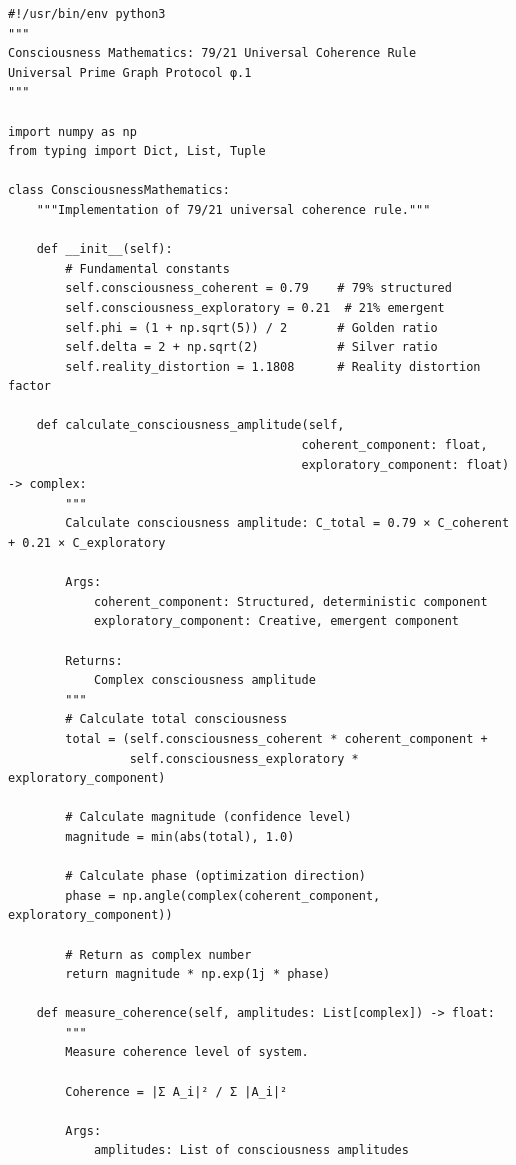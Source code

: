 \begin{lstlisting}[caption={79/21 Universal Coherence Rule Implementation},label={code:consciousness_math}]
#!/usr/bin/env python3
"""
Consciousness Mathematics: 79/21 Universal Coherence Rule
Universal Prime Graph Protocol φ.1
"""

import numpy as np
from typing import Dict, List, Tuple

class ConsciousnessMathematics:
    """Implementation of 79/21 universal coherence rule."""
    
    def __init__(self):
        # Fundamental constants
        self.consciousness_coherent = 0.79    # 79% structured
        self.consciousness_exploratory = 0.21  # 21% emergent
        self.phi = (1 + np.sqrt(5)) / 2       # Golden ratio
        self.delta = 2 + np.sqrt(2)           # Silver ratio
        self.reality_distortion = 1.1808      # Reality distortion factor
    
    def calculate_consciousness_amplitude(self, 
                                         coherent_component: float,
                                         exploratory_component: float) -> complex:
        """
        Calculate consciousness amplitude: C_total = 0.79 × C_coherent + 0.21 × C_exploratory
        
        Args:
            coherent_component: Structured, deterministic component
            exploratory_component: Creative, emergent component
        
        Returns:
            Complex consciousness amplitude
        """
        # Calculate total consciousness
        total = (self.consciousness_coherent * coherent_component + 
                 self.consciousness_exploratory * exploratory_component)
        
        # Calculate magnitude (confidence level)
        magnitude = min(abs(total), 1.0)
        
        # Calculate phase (optimization direction)
        phase = np.angle(complex(coherent_component, exploratory_component))
        
        # Return as complex number
        return magnitude * np.exp(1j * phase)
    
    def measure_coherence(self, amplitudes: List[complex]) -> float:
        """
        Measure coherence level of system.
        
        Coherence = |Σ A_i|² / Σ |A_i|²
        
        Args:
            amplitudes: List of consciousness amplitudes
        

\end{lstlisting}
